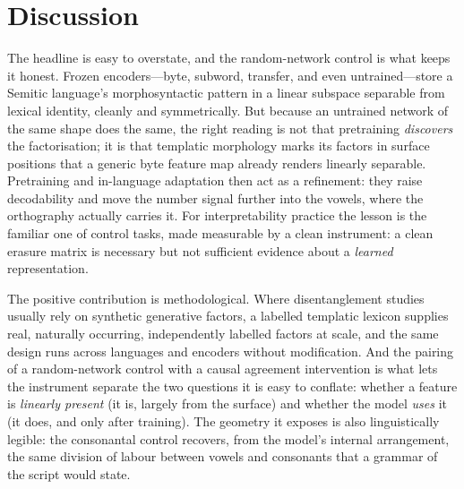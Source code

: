 \documentclass[11pt]{article}
\begin{document}
\begin{table}[t]
  \centering
  \small
  
  \caption{Balanced grids. Each lexeme contributes one form per factor value;
  chance for lexeme \textsc{nn} retrieval is $1/|\text{test lexemes}|$.}
  \label{tab:grids}
\end{table}

\section{Discussion}
\label{sec:discussion}

The headline is easy to overstate, and the random-network control is what keeps it
honest. Frozen encoders---byte, subword, transfer, and even untrained---store a
Semitic language's morphosyntactic pattern in a linear subspace separable from
lexical identity, cleanly and symmetrically. But because an untrained network of the
same shape does the same, the right reading is not that pretraining \emph{discovers}
the factorisation; it is that templatic morphology marks its factors in surface
positions that a generic byte feature map already renders linearly separable.
Pretraining and in-language adaptation then act as a refinement: they raise
decodability and move the number signal further into the vowels, where the
orthography actually carries it. For interpretability practice the lesson is the
familiar one of control tasks, made measurable by a clean instrument: a clean
erasure matrix is necessary but not sufficient evidence about a \emph{learned}
representation.

The positive contribution is methodological. Where disentanglement studies usually
rely on synthetic generative factors, a labelled templatic lexicon supplies real,
naturally occurring, independently labelled factors at scale, and the same design
runs across languages and encoders without modification. And the pairing of a
random-network control with a causal agreement intervention is what lets the
instrument separate the two questions it is easy to conflate: whether a feature is
\emph{linearly present} (it is, largely from the surface) and whether the model
\emph{uses} it (it does, and only after training). The geometry it exposes is also
linguistically legible: the consonantal control recovers, from the model's internal
arrangement, the same division of labour between vowels and consonants that a grammar
of the script would state.

\end{document}
